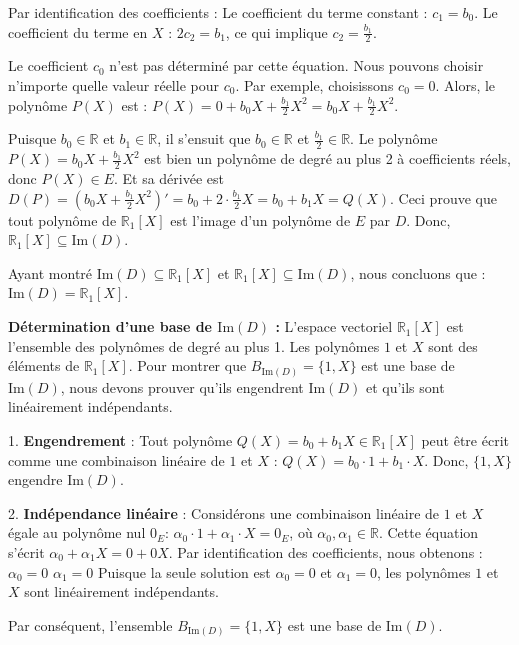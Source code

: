 \documentclass{report}
\begin{document}
Par identification des coefficients :
Le coefficient du terme constant : $c_1 = b_0$.
Le coefficient du terme en $X$ : $2c_2 = b_1$, ce qui implique $c_2 = \frac{b_1}{2}$.

Le coefficient $c_0$ n'est pas déterminé par cette équation. Nous pouvons choisir n'importe quelle valeur réelle pour $c_0$. Par exemple, choisissons $c_0 = 0$.
Alors, le polynôme $P(X)$ est :
$P(X) = 0 + b_0 X + \frac{b_1}{2} X^2 = b_0 X + \frac{b_1}{2} X^2$.

Puisque $b_0 \in \mathbb{R}$ et $b_1 \in \mathbb{R}$, il s'ensuit que $b_0 \in \mathbb{R}$ et $\frac{b_1}{2} \in \mathbb{R}$.
Le polynôme $P(X) = b_0 X + \frac{b_1}{2} X^2$ est bien un polynôme de degré au plus 2 à coefficients réels, donc $P(X) \in E$.
Et sa dérivée est $D(P) = (b_0 X + \frac{b_1}{2} X^2)' = b_0 + 2 \cdot \frac{b_1}{2} X = b_0 + b_1 X = Q(X)$.
Ceci prouve que tout polynôme de $\mathbb{R}_1[X]$ est l'image d'un polynôme de $E$ par $D$.
Donc, $\mathbb{R}_1[X] \subseteq \text{Im}(D)$.

Ayant montré $\text{Im}(D) \subseteq \mathbb{R}_1[X]$ et $\mathbb{R}_1[X] \subseteq \text{Im}(D)$, nous concluons que :
$\text{Im}(D) = \mathbb{R}_1[X]$.

\textbf{Détermination d'une base de $\text{Im}(D)$ :}
L'espace vectoriel $\mathbb{R}_1[X]$ est l'ensemble des polynômes de degré au plus 1.
Les polynômes $1$ et $X$ sont des éléments de $\mathbb{R}_1[X]$.
Pour montrer que $B_{\text{Im}(D)} = \{1, X\}$ est une base de $\text{Im}(D)$, nous devons prouver qu'ils engendrent $\text{Im}(D)$ et qu'ils sont linéairement indépendants.

1.  \textbf{Engendrement} : Tout polynôme $Q(X) = b_0 + b_1 X \in \mathbb{R}_1[X]$ peut être écrit comme une combinaison linéaire de $1$ et $X$ :
    $Q(X) = b_0 \cdot 1 + b_1 \cdot X$.
    Donc, $\{1, X\}$ engendre $\text{Im}(D)$.

2.  \textbf{Indépendance linéaire} : Considérons une combinaison linéaire de $1$ et $X$ égale au polynôme nul $0_E$:
    $\alpha_0 \cdot 1 + \alpha_1 \cdot X = 0_E$, où $\alpha_0, \alpha_1 \in \mathbb{R}$.
    Cette équation s'écrit $\alpha_0 + \alpha_1 X = 0 + 0X$.
    Par identification des coefficients, nous obtenons :
    $\alpha_0 = 0$
    $\alpha_1 = 0$
    Puisque la seule solution est $\alpha_0 = 0$ et $\alpha_1 = 0$, les polynômes $1$ et $X$ sont linéairement indépendants.

Par conséquent, l'ensemble $B_{\text{Im}(D)} = \{1, X\}$ est une base de $\text{Im}(D)$.
\end{document}
